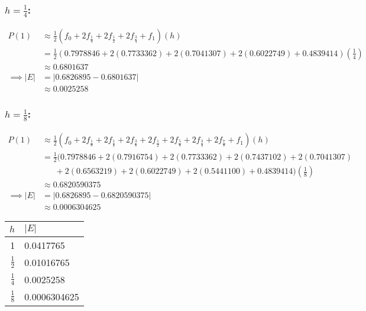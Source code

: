 \documentclass[12pt]{article}
\begin{document}
\subsubsection*{$h = \frac{1}{4}$:}
\begin{align*}
	P(1) &\approx \textstyle\frac{1}{2}(f_0 + 2f_{\frac{1}{4}} + 2f_{\frac{1}{2}} + 2f_{\frac{3}{4}} + f_1)(h) \\
	&= \textstyle\frac{1}{2}(0.7978846 + 2(0.7733362) + 2(0.7041307) + 2(0.6022749) + 0.4839414)(\textstyle\frac{1}{4}) \\
	&\approx 0.6801637 \\
	\implies |E| &= |0.6826895 - 0.6801637| \\
	&\approx 0.0025258
\end{align*}
\subsubsection*{$h = \frac{1}{8}$:}
\begin{align*}
	P(1) &\approx \textstyle\frac{1}{2}(f_0 + 2f_{\frac{1}{8}} + 2f_{\frac{1}{4}} + 2f_{\frac{3}{8}} + 2f_{\frac{1}{2}} + 2f_{\frac{5}{8}} + 2f_{\frac{3}{4}} + 2f_{\frac{7}{8}} + f_1)(h) \\
	&= \textstyle\frac{1}{2}\Big(0.7978846 + 2(0.7916754) + 2(0.7733362) + 2(0.7437102) + 2(0.7041307) \\
	&\ \ \ \ \ \ \ + 2(0.6563219) + 2(0.6022749) + 2(0.5441100) + 0.4839414\Big)(\textstyle\frac{1}{8}) \\
	&\approx 0.6820590375 \\
	\implies |E| &= |0.6826895 - 0.6820590375| \\
	&\approx 0.0006304625
\end{align*}
\begin{table}[H]
	\begin{tabular}{|r|l|}\hline
		$h$ & $|E|$ \\ \hline
		1 & 0.0417765 \\
		$\frac{1}{2}$ & 0.01016765 \\
		$\frac{1}{4}$ & 0.0025258 \\
		$\frac{1}{8}$ & 0.0006304625 \\ \hline
	\end{tabular}
\end{table}
\end{document}
